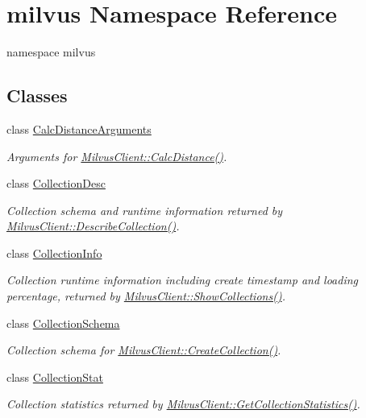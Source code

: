 \hypertarget{namespacemilvus}{}\section{milvus Namespace Reference}
\label{namespacemilvus}


namespace milvus  


\subsection*{Classes}
\begin{DoxyCompactItemize}
\item 
class \hyperlink{classmilvus_1_1_calc_distance_arguments}{Calc\+Distance\+Arguments}
\begin{DoxyCompactList}\small\item\em Arguments for \hyperlink{classmilvus_1_1_milvus_client_a105c243c7d93ff2cd81b4d9c1751f5fb}{Milvus\+Client\+::\+Calc\+Distance()}. \end{DoxyCompactList}\item 
class \hyperlink{classmilvus_1_1_collection_desc}{Collection\+Desc}
\begin{DoxyCompactList}\small\item\em Collection schema and runtime information returned by \hyperlink{classmilvus_1_1_milvus_client_a5bdc7d4afdf9c84b7b50b4a8b4508c6e}{Milvus\+Client\+::\+Describe\+Collection()}. \end{DoxyCompactList}\item 
class \hyperlink{classmilvus_1_1_collection_info}{Collection\+Info}
\begin{DoxyCompactList}\small\item\em Collection runtime information including create timestamp and loading percentage, returned by \hyperlink{classmilvus_1_1_milvus_client_a8c5d625d72056a6e4f2f98607ebd0051}{Milvus\+Client\+::\+Show\+Collections()}. \end{DoxyCompactList}\item 
class \hyperlink{classmilvus_1_1_collection_schema}{Collection\+Schema}
\begin{DoxyCompactList}\small\item\em Collection schema for \hyperlink{classmilvus_1_1_milvus_client_a437b0a97bd9f7789504fdfeab885b5dd}{Milvus\+Client\+::\+Create\+Collection()}. \end{DoxyCompactList}\item 
class \hyperlink{classmilvus_1_1_collection_stat}{Collection\+Stat}
\begin{DoxyCompactList}\small\item\em Collection statistics returned by \hyperlink{classmilvus_1_1_milvus_client_a0c49e2a5728a70f203118232c16ba47f}{Milvus\+Client\+::\+Get\+Collection\+Statistics()}. \end{DoxyCompactList}\item 

\end{DoxyCompactItemize}
